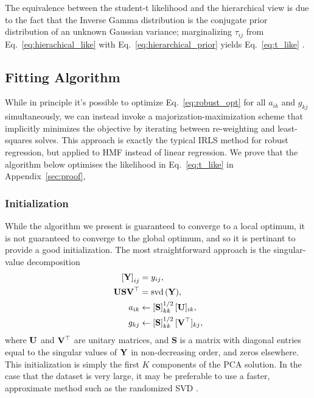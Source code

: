 \documentclass[onecolumn,floatfix]{aastex631}
\DeclareMathOperator{\svd}{svd}
\begin{document}
The equivalence between the student-t likelihood and the hierarchical view is due to the fact that the Inverse Gamma distribution is the conjugate prior distribution of an unknown Gaussian variance; marginalizing $\tau_{ij}$ from Eq.~\eqref{eq:hierachical_like} with Eq.~\eqref{eq:hierarchical_prior} yields Eq.~\eqref{eq:t_like} \citep[e.g.][]{lange1989}.

\subsection{Fitting Algorithm}

While in principle it's possible to optimize Eq.~\eqref{eq:robust_opt} for all $a_{ik}$ and $g_{kj}$ simultaneously, we can instead invoke a majorization-maximization scheme that implicitly minimizes the objective by iterating between re-weighting and least-squares solves.
This approach is exactly the typical IRLS method for robust regression, but applied to HMF instead of linear regression.
We prove that the algorithm below optimises the likelihood in Eq.~\eqref{eq:t_like} in Appendix~\ref{sec:proof},

\subsubsection{Initialization}

While the algorithm we present is guaranteed to converge to a local optimum, it is not guaranteed to converge to the global optimum, and so it is pertinant to provide a good initialization.
The most straightforward approach is the singular-value decomposition
\begin{align}
    \left[{\bf Y}\right]_{ij} &= y_{ij}, \\
    {\bf U} {\bf S} {\bf V}^\top &= \svd{\left({\bf Y}\right)}, \\
    a_{ik} &\leftarrow \left[{\bf S}\right]_{kk}^{1/2} [{\bf U}]_{ik}, \\
    g_{kj} &\leftarrow \left[{\bf S}\right]_{kk}^{1/2} [{\bf V}^\top]_{kj},
\end{align}
where ${\bf U}$ and ${\bf V}^\top$ are unitary matrices, and {\bf S} is a matrix with diagonal entries equal to the singular values of ${\bf Y}$ in non-decreasing order, and zeros elsewhere.
This initialization is simply the first $K$ components of the PCA solution.
In the case that the dataset is very large, it may be preferable to use a faster, approximate method such as the randomized SVD \citep{halko2011}.
\end{document}
